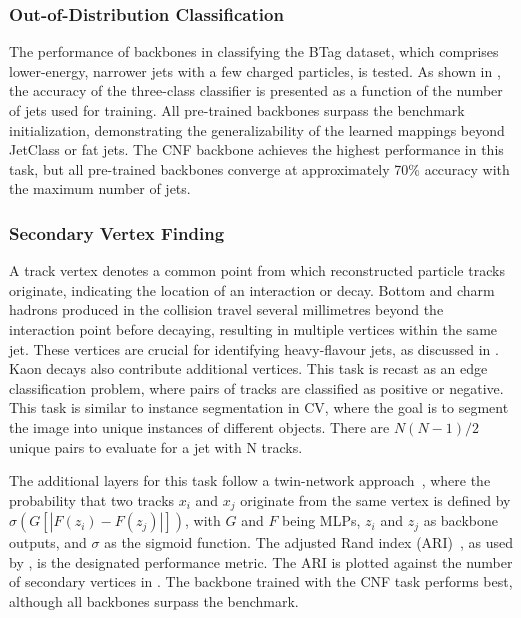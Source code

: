 \subsubsection{Out-of-Distribution Classification}

The performance of backbones in classifying the BTag dataset, which comprises lower-energy, narrower jets with a few charged particles, is tested.
As shown in , the accuracy of the three-class classifier is presented as a function of the number of jets used for training.
All pre-trained backbones surpass the benchmark initialization, demonstrating the generalizability of the learned mappings beyond JetClass or fat jets.
The CNF backbone achieves the highest performance in this task, but all pre-trained backbones converge at approximately 70\% accuracy with the maximum number of jets.

\subsubsection{Secondary Vertex Finding}

A track vertex denotes a common point from which reconstructed particle tracks originate, indicating the location of an interaction or decay.
Bottom and charm hadrons produced in the collision travel several millimetres beyond the interaction point before decaying, resulting in multiple vertices within the same jet.
These vertices are crucial for identifying heavy-flavour jets, as discussed in .
Kaon decays also contribute additional vertices.
This task is recast as an edge classification problem, where pairs of tracks are classified as positive or negative.
This task is similar to instance segmentation in CV, where the goal is to segment the image into unique instances of different objects.
There are $N(N-1)/2$ unique pairs to evaluate for a jet with N tracks.

The additional layers for this task follow a twin-network approach~\cite{siamese}, where the probability that two tracks $x_i$ and $x_j$ originate from the same vertex is defined by $\sigma\left(G\left[|F\left(z_i\right)-F\left(z_j\right)|\right]\right)$, with $G$ and $F$ being MLPs, $z_i$ and $z_j$ as backbone outputs, and $\sigma$ as the sigmoid function.
The adjusted Rand index (ARI)~\cite{ari}, as used by \textcite{SecondaryVertexFinding}, is the designated performance metric.
The ARI is plotted against the number of secondary vertices in .
The backbone trained with the CNF task performs best, although all backbones surpass the benchmark.

